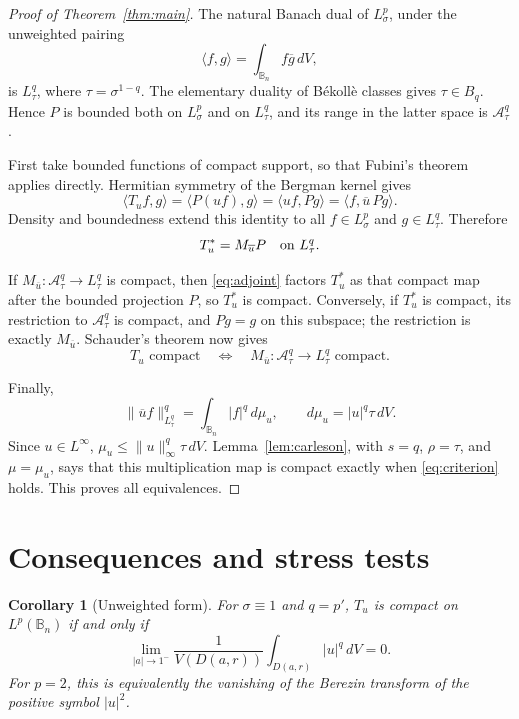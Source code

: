 \documentclass[11pt]{article}
\newtheorem{corollary}[theorem]{Corollary}
\newcommand{\B}{\mathbb B_n}
\newcommand{\A}{\mathcal A}
\newcommand{\dd}{\,dV}
\begin{document}
\begin{proof}[Proof of Theorem~\ref{thm:main}]
The natural Banach dual of $L^p_\sigma$, under the unweighted pairing
\[
                  \langle f,g\rangle=\int_{\B}f\overline g\dd,
\]
is $L^q_\tau$, where $\tau=\sigma^{1-q}$.  The elementary duality of
B\'ekoll\`e classes gives $\tau\in B_q$.  Hence $P$ is bounded both on
$L^p_\sigma$ and on $L^q_\tau$, and its range in the latter space is
$\A^q_\tau$.

First take bounded functions of compact support, so that Fubini's theorem
applies directly.  Hermitian symmetry of the Bergman kernel gives
\[
 \langle T_uf,g\rangle
 =\langle P(uf),g\rangle
 =\langle uf,Pg\rangle
 =\langle f,\overline u\,Pg\rangle.
\]
Density and boundedness extend this identity to all
$f\in L^p_\sigma$ and $g\in L^q_\tau$.  Therefore
\begin{equation}\label{eq:adjoint}
                   T_u^*=M_{\overline u}P
                   \quad\hbox{on }L^q_\tau.
\end{equation}

If $M_{\overline u}:\A^q_\tau\to L^q_\tau$ is compact, then
\eqref{eq:adjoint} factors $T_u^*$ as that compact map after the bounded
projection $P$, so $T_u^*$ is compact.  Conversely, if $T_u^*$ is compact,
its restriction to $\A^q_\tau$ is compact, and $Pg=g$ on this subspace;
the restriction is exactly $M_{\overline u}$.  Schauder's theorem now gives
\[
 T_u\text{ compact}
 \quad\Longleftrightarrow\quad
 M_{\overline u}:\A^q_\tau\to L^q_\tau\text{ compact}.
\]

Finally,
\[
 \|\overline u f\|_{L^q_\tau}^q
 =\int_{\B}|f|^q\,d\mu_u,
 \qquad d\mu_u=|u|^q\tau\,dV.
\]
Since $u\in L^\infty$, $\mu_u\le\|u\|_\infty^q\tau\,dV$.
Lemma~\ref{lem:carleson}, with $s=q$, $\rho=\tau$, and
$\mu=\mu_u$, says that this multiplication map is compact exactly when
\eqref{eq:criterion} holds.  This proves all equivalences.
\end{proof}

\section{Consequences and stress tests}

\begin{corollary}[Unweighted form]
For $\sigma\equiv1$ and $q=p'$, $T_u$ is compact on $L^p(\B)$ if and only if
\[
 \lim_{|a|\to1^-}\frac{1}{V(D(a,r))}
 \int_{D(a,r)}|u|^q\dd=0.
\]
For $p=2$, this is equivalently the vanishing of the Berezin transform of
the positive symbol $|u|^2$.
\end{corollary}
\end{document}
